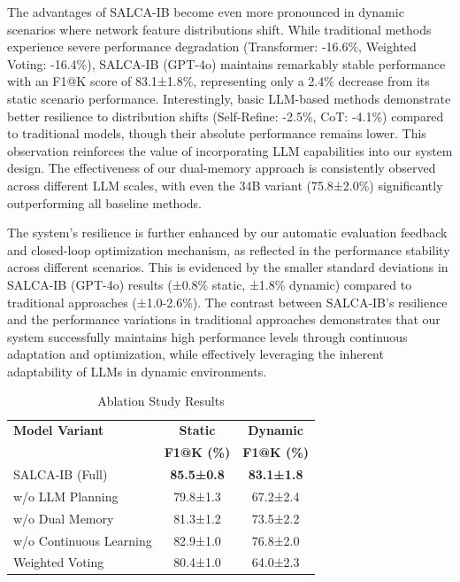 \documentclass[conference]{IEEEtran}
\begin{document}
The advantages of SALCA-IB become even more pronounced in dynamic scenarios where network feature distributions shift. While traditional methods experience severe performance degradation (Transformer: -16.6\%, Weighted Voting: -16.4\%), SALCA-IB (GPT-4o) maintains remarkably stable performance with an F1@K score of 83.1±1.8\%, representing only a 2.4\% decrease from its static scenario performance. Interestingly, basic LLM-based methods demonstrate better resilience to distribution shifts (Self-Refine: -2.5\%, CoT: -4.1\%) compared to traditional models, though their absolute performance remains lower. This observation reinforces the value of incorporating LLM capabilities into our system design. The effectiveness of our dual-memory approach is consistently observed across different LLM scales, with even the 34B variant (75.8±2.0\%) significantly outperforming all baseline methods.

The system's resilience is further enhanced by our automatic evaluation feedback and closed-loop optimization mechanism, as reflected in the performance stability across different scenarios. This is evidenced by the smaller standard deviations in SALCA-IB (GPT-4o) results (±0.8\% static, ±1.8\% dynamic) compared to traditional approaches (±1.0-2.6\%). The contrast between SALCA-IB's resilience and the performance variations in traditional approaches demonstrates that our system successfully maintains high performance levels through continuous adaptation and optimization, while effectively leveraging the inherent adaptability of LLMs in dynamic environments.

\begin{table}[!t]
\caption{Ablation Study Results}
\label{tab:ablation}
\renewcommand{\arraystretch}{1.2}
\begin{center}
\begin{tabular}{l|cc}
\hline\hline
\textbf{Model Variant} & \textbf{Static} & \textbf{Dynamic} \\
& \textbf{F1@K (\%)} & \textbf{F1@K (\%)} \\
\hline
SALCA-IB (Full) & \textbf{85.5±0.8} & \textbf{83.1±1.8} \\
\hline
w/o LLM Planning & 79.8±1.3 & 67.2±2.4 \\
w/o Dual Memory & 81.3±1.2 & 73.5±2.2 \\
w/o Continuous Learning & 82.9±1.0 & 76.8±2.0 \\
\hline
Weighted Voting & 80.4±1.0 & 64.0±2.3 \\
\hline\hline
\end{tabular}
\end{center}
\end{table}
\end{document}
